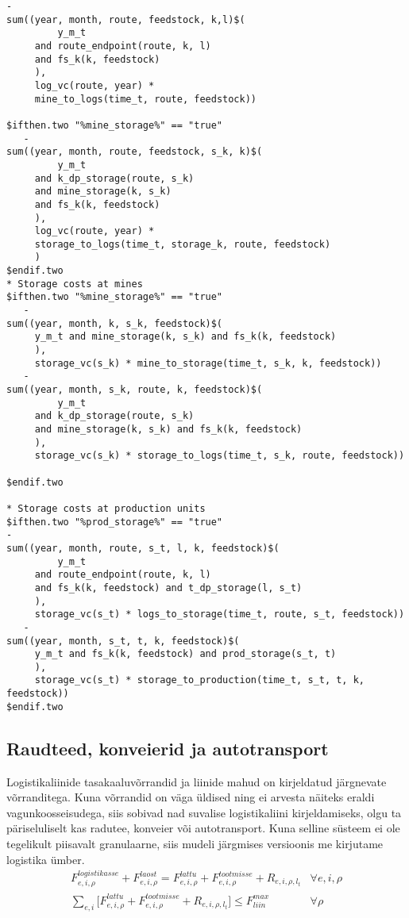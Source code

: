 \documentclass[10pt,a4paper]{article}
\begin{document}
\begin{verbatim}
-
sum((year, month, route, feedstock, k,l)$(
         y_m_t
     and route_endpoint(route, k, l)
     and fs_k(k, feedstock)
     ),
     log_vc(route, year) *
     mine_to_logs(time_t, route, feedstock))

$ifthen.two "%mine_storage%" == "true"
   -
sum((year, month, route, feedstock, s_k, k)$(
         y_m_t
     and k_dp_storage(route, s_k)
     and mine_storage(k, s_k)
     and fs_k(k, feedstock)
     ),
     log_vc(route, year) *
     storage_to_logs(time_t, storage_k, route, feedstock)
     )
$endif.two
* Storage costs at mines
$ifthen.two "%mine_storage%" == "true"
   -
sum((year, month, k, s_k, feedstock)$(
     y_m_t and mine_storage(k, s_k) and fs_k(k, feedstock)
     ),
     storage_vc(s_k) * mine_to_storage(time_t, s_k, k, feedstock))
   -
sum((year, month, s_k, route, k, feedstock)$(
         y_m_t
     and k_dp_storage(route, s_k)
     and mine_storage(k, s_k) and fs_k(k, feedstock)
     ),
     storage_vc(s_k) * storage_to_logs(time_t, s_k, route, feedstock))

$endif.two

* Storage costs at production units
$ifthen.two "%prod_storage%" == "true"
-
sum((year, month, route, s_t, l, k, feedstock)$(
         y_m_t
     and route_endpoint(route, k, l)
     and fs_k(k, feedstock) and t_dp_storage(l, s_t)
     ),
     storage_vc(s_t) * logs_to_storage(time_t, route, s_t, feedstock))
   -
sum((year, month, s_t, t, k, feedstock)$(
     y_m_t and fs_k(k, feedstock) and prod_storage(s_t, t)
     ),
     storage_vc(s_t) * storage_to_production(time_t, s_t, t, k, feedstock))
$endif.two
\end{verbatim}

\subsection{Raudteed, konveierid ja autotransport}
Logistikaliinide tasakaaluvõrrandid ja liinide mahud on kirjeldatud järgnevate võrranditega. Kuna võrrandid on väga üldised ning ei arvesta näiteks eraldi vagunkoosseisudega, siis sobivad nad suvalise logistikaliini kirjeldamiseks, olgu ta päriseluliselt kas radutee, konveier või autotransport. Kuna selline süsteem ei ole tegelikult piisavalt granulaarne, siis mudeli järgmises versioonis me kirjutame logistika ümber.
\begin{align}
F^{logistikasse}_{e,i,\rho} + F^{laost}_{e,i,\rho} =F^{lattu}_{e,i,\rho} + F^{tootmisse}_{e,i,\rho} + R_{e,i,\rho, l_t}  &\forall e, i, \rho \\
\sum_{e,i} \bigg[ F^{lattu}_{e,i,\rho} + F^{tootmisse}_{e,i,\rho} + R_{e,i,\rho, l_t} \bigg] \leq F^{max}_{liin} &\forall \rho 
\end{align}
\end{document}
